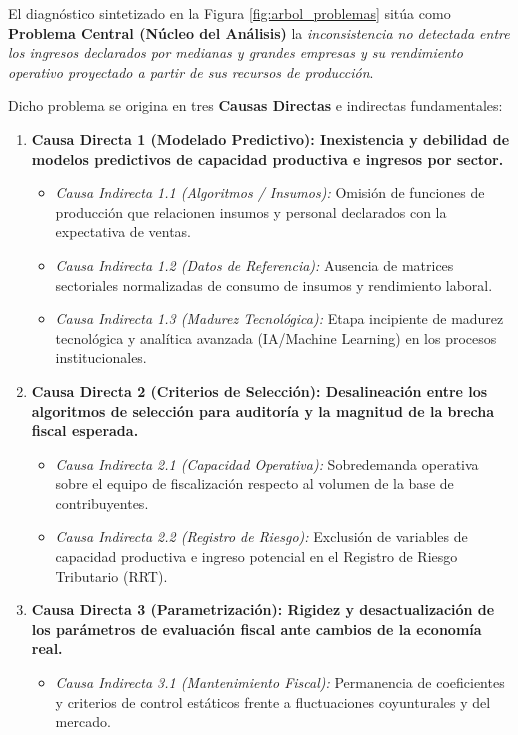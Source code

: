 El diagnóstico sintetizado en la Figura \ref{fig:arbol_problemas} sitúa como \textbf{Problema Central (Núcleo del Análisis)} la \textit{inconsistencia no detectada entre los ingresos declarados por medianas y grandes empresas y su rendimiento operativo proyectado a partir de sus recursos de producción}. 

Dicho problema se origina en tres \textbf{Causas Directas} e indirectas fundamentales:
\begin{enumerate}
    \item \textbf{Causa Directa 1 (Modelado Predictivo): Inexistencia y debilidad de modelos predictivos de capacidad productiva e ingresos por sector.}
    \begin{itemize}
        \item \textit{Causa Indirecta 1.1 (Algoritmos / Insumos):} Omisión de funciones de producción que relacionen insumos y personal declarados con la expectativa de ventas.
        \item \textit{Causa Indirecta 1.2 (Datos de Referencia):} Ausencia de matrices sectoriales normalizadas de consumo de insumos y rendimiento laboral.
        \item \textit{Causa Indirecta 1.3 (Madurez Tecnológica):} Etapa incipiente de madurez tecnológica y analítica avanzada (IA/Machine Learning) en los procesos institucionales.
    \end{itemize}
    
    \item \textbf{Causa Directa 2 (Criterios de Selección): Desalineación entre los algoritmos de selección para auditoría y la magnitud de la brecha fiscal esperada.}
    \begin{itemize}
        \item \textit{Causa Indirecta 2.1 (Capacidad Operativa):} Sobredemanda operativa sobre el equipo de fiscalización respecto al volumen de la base de contribuyentes.
        \item \textit{Causa Indirecta 2.2 (Registro de Riesgo):} Exclusión de variables de capacidad productiva e ingreso potencial en el Registro de Riesgo Tributario (RRT).
    \end{itemize}
    
    \item \textbf{Causa Directa 3 (Parametrización): Rigidez y desactualización de los parámetros de evaluación fiscal ante cambios de la economía real.}
    \begin{itemize}
        \item \textit{Causa Indirecta 3.1 (Mantenimiento Fiscal):} Permanencia de coeficientes y criterios de control estáticos frente a fluctuaciones coyunturales y del mercado.
    \end{itemize}
\end{enumerate}

